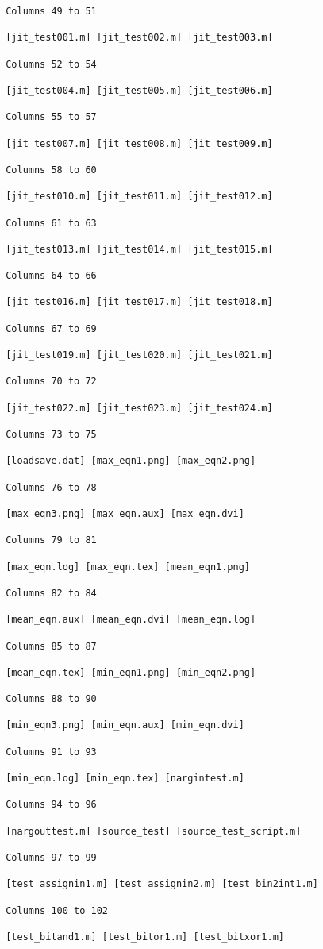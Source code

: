 \begin{verbatim}
 Columns 49 to 51

 [jit_test001.m] [jit_test002.m] [jit_test003.m] 

 Columns 52 to 54

 [jit_test004.m] [jit_test005.m] [jit_test006.m] 

 Columns 55 to 57

 [jit_test007.m] [jit_test008.m] [jit_test009.m] 

 Columns 58 to 60

 [jit_test010.m] [jit_test011.m] [jit_test012.m] 

 Columns 61 to 63

 [jit_test013.m] [jit_test014.m] [jit_test015.m] 

 Columns 64 to 66

 [jit_test016.m] [jit_test017.m] [jit_test018.m] 

 Columns 67 to 69

 [jit_test019.m] [jit_test020.m] [jit_test021.m] 

 Columns 70 to 72

 [jit_test022.m] [jit_test023.m] [jit_test024.m] 

 Columns 73 to 75

 [loadsave.dat] [max_eqn1.png] [max_eqn2.png] 

 Columns 76 to 78

 [max_eqn3.png] [max_eqn.aux] [max_eqn.dvi] 

 Columns 79 to 81

 [max_eqn.log] [max_eqn.tex] [mean_eqn1.png] 

 Columns 82 to 84

 [mean_eqn.aux] [mean_eqn.dvi] [mean_eqn.log] 

 Columns 85 to 87

 [mean_eqn.tex] [min_eqn1.png] [min_eqn2.png] 

 Columns 88 to 90

 [min_eqn3.png] [min_eqn.aux] [min_eqn.dvi] 

 Columns 91 to 93

 [min_eqn.log] [min_eqn.tex] [nargintest.m] 

 Columns 94 to 96

 [nargouttest.m] [source_test] [source_test_script.m] 

 Columns 97 to 99

 [test_assignin1.m] [test_assignin2.m] [test_bin2int1.m] 

 Columns 100 to 102

 [test_bitand1.m] [test_bitor1.m] [test_bitxor1.m] 


\end{verbatim}
